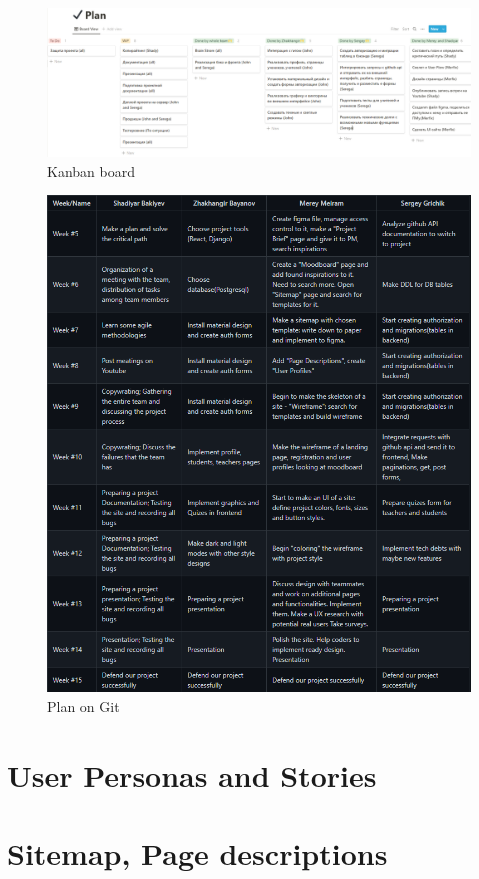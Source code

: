 \begin{figure}[ht]
    \centering
    \includegraphics[scale=0.5]{Kanbanbrd.png}
    \caption{Kanban board}
    \label{fig:knbrd}
\end{figure}
\begin{figure}[t]
    \centering
    \includegraphics[scale=0.5]{weeksplan.png}
    \caption{Plan on Git}
    \label{fig:weeksplan}
\end{figure}

\section{User Personas and Stories}

\section{Sitemap, Page descriptions}
